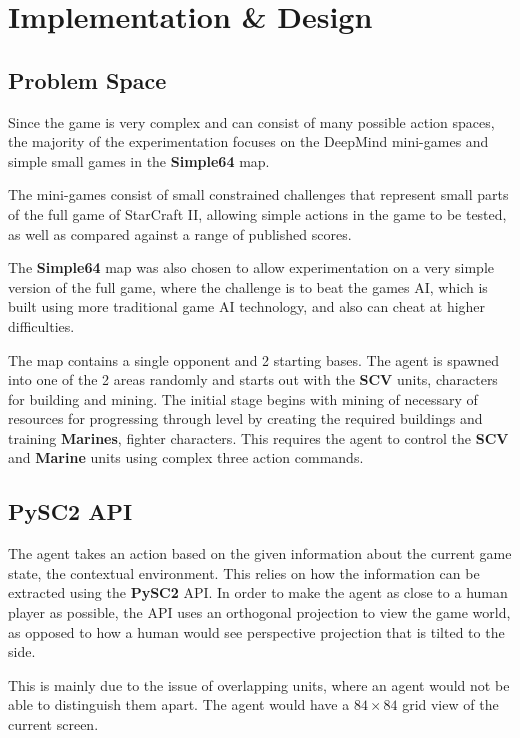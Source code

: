 \chapter{Implementation \& Design}%
\label{implem}

\section{Problem Space}
Since the game is very complex and can consist of many possible action spaces,
the majority of the experimentation focuses on the DeepMind mini-games
and simple small games in the \textbf{Simple64} map.

The mini-games consist of small constrained challenges that represent
small parts of the full game of StarCraft II, allowing simple actions
in the game to be tested, as well as compared against a range of
published scores.

The \textbf{Simple64} map was also chosen to allow experimentation on
a very simple version of the full game, where the challenge is
to beat the games AI, which is built using more traditional game AI
technology, and also can cheat at higher difficulties.

The map contains a single opponent and 2 starting bases.
The agent is spawned into one of the 2 areas randomly and starts out
with the \textbf{SCV} units, characters for building and mining.
The initial stage begins with mining of necessary of resources for progressing
through level by creating the required buildings and training \textbf{Marines}, fighter characters.
This requires the agent to control the \textbf{SCV} and \textbf{Marine} units
using complex three action commands.

\section{PySC2 API}


The agent takes an action based on the given information about the current game
state, the contextual environment.
This relies on how the information can be extracted using the \textbf{PySC2} API\@.
In order to make the agent as close to a human player as possible, the API uses an orthogonal
projection to view the game world, as opposed to how a human would see
perspective projection that is tilted to the side.

This is mainly due to the issue of overlapping units,
where an agent would not be able to distinguish them apart.
The agent would have a $84 \times 84$ grid view of the current screen.

